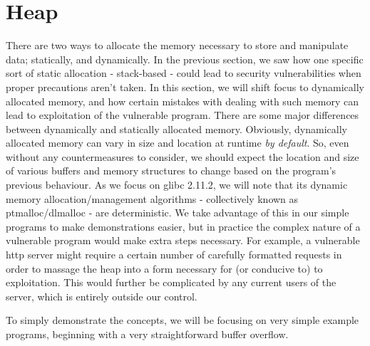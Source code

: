 \section{Heap}
There are two ways to allocate the memory necessary to store and manipulate data;
statically, and dynamically. In the previous section, we saw how one
specific sort of static allocation - stack-based - could lead to
security vulnerabilities when proper precautions aren't taken. In this section,
we will shift focus to dynamically allocated memory, and how
certain mistakes with dealing with such memory can lead to exploitation
of the vulnerable program. There are some major differences between
dynamically and statically allocated memory. Obviously, dynamically
allocated memory can vary in size and location at runtime \emph{by default}.
So, even without any countermeasures to consider, we should expect
the location and size of various buffers and memory structures to change
based on the program's previous behaviour. As we focus on glibc 2.11.2,
we will note that its dynamic memory allocation/management algorithms - 
collectively known as ptmalloc/dlmalloc - are deterministic. We take
advantage of this in our simple programs to make demonstrations easier,
but in practice the complex nature of a vulnerable program would make
extra steps necessary. For example, a vulnerable http server might
require a certain number of carefully formatted requests in order
to massage the heap into a form necessary for (or conducive to) to exploitation.
This would further be complicated by any current users of the server,
which is entirely outside our control.

To simply demonstrate the concepts, we will be focusing on very simple
example programs, beginning with a very straightforward buffer overflow.






